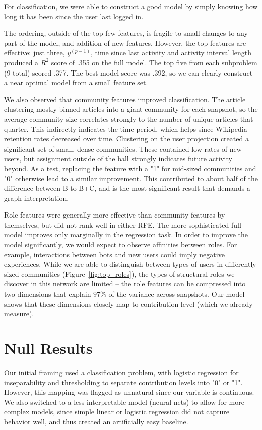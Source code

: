\documentclass[letterpaper, 12pt, conference]{ieeeconf}
\begin{document}
For classification, we were able to construct a good model by simply knowing how long it has been since the user last logged in. 

The ordering, outside of the top few features, is fragile to small changes to any part of the model, and addition of new features. However, the top features are effective: just three, $y^{(p-1)}$, time since last activity and activity interval length produced a $R^2$ score of .355 on the full model. The top five from each subproblem (9 total) scored .377. The best model score was .392, so we can clearly construct a near optimal model from a small feature set.

We also observed that community features improved classification. The article clustering mostly binned articles into a giant community for each snapshot, so the average community size correlates strongly to the number of unique articles that quarter. This indirectly indicates the time period, which helps since Wikipedia retention rates decreased over time. Clustering on the user projection created a significant set of small, dense communities. These contained low rates of new users, but assignment outside of the ball strongly indicates future activity beyond. As a test, replacing the feature with a "1" for mid-sized communities and "0" otherwise lead to a similar improvement. This contributed to about half of the difference between B to B+C, and is the most significant result that demands a graph interpretation.

Role features were generally more effective than community features by themselves, but did not rank well in either RFE. The more sophisticated full model improves only marginally in the regression task. In order to improve the model significantly, we would expect to observe affinities between roles. For example, interactions between bots and new users could imply negative experiences. While we are able to distinguish between types of users in differently sized communities (Figure~\ref{fig:top_roles}), the types of structural roles we discover in this network are limited -- the role features can be compressed into two dimensions that explain $97\%$ of the variance across snapshots. Our model shows that these dimensions closely map to contribution level (which we already measure).

\section{Null Results}
Our initial framing used a classification problem, with logistic regression for inseparability and thresholding to separate contribution levels into "0" or "1". However, this mapping was flagged as unnatural since our variable is continuous. We also switched to a less interpretable model (neural nets) to allow for more complex models, since simple linear or logistic regression did not capture behavior well, and thus created an artificially easy baseline. 
\end{document}
